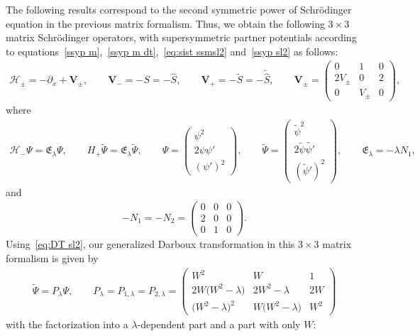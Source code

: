 \documentclass[10pt,a4paper]{amsart}
\numberwithin{equation}{section}
\begin{document}
The following results correspond to the second symmetric power of Schr\"odinger equation in the previous matrix formalism. Thus, we obtain the following $3\times 3$ matrix Schr\"odinger operators, with supersymmetric partner potentials according to equations~\eqref{ssyp m},~\eqref{ssyp m dt},~\eqref{eq:sist ssmsl2} and~\eqref{ssyp sl2} as follows:
\begin{gather*}
\mathcal H_\pm=-\partial_x+\mathbf{V}_\pm,\qquad \mathbf{V}_-=-S=-\widehat{S},\qquad \mathbf{V}_+=-\widetilde{S}=-\widetilde{\widehat{S}},\qquad \mathbf{V}_{\pm} =\begin{pmatrix}0&1&0\\2V_{\pm}&0&2\\0&V_\pm&0\end{pmatrix}\!,
\end{gather*}
where
\begin{gather*}
\mathcal H_-\Psi=\mathfrak{E}_{\lambda} \Psi,\qquad
H_+\widetilde{\Psi}=\mathfrak{E}_{\lambda} \widetilde{\Psi}, \qquad
\Psi=\begin{pmatrix} \psi^2\\2\psi\psi'\\(\psi')^2\end{pmatrix}\!,\qquad \widetilde{\Psi}=\begin{pmatrix} \widetilde{\psi}^2\\2\widetilde{\psi}\widetilde{\psi'}\\(\widetilde{\psi}')^2\end{pmatrix}\!,\qquad \mathfrak{E}_{\lambda}=-\lambda N_1,
\end{gather*}
and
\begin{gather*}
-N_1=-N_2=\begin{pmatrix}0&0&0\\2&0&0\\0&1&0\end{pmatrix}\!.
\end{gather*}
Using~\eqref{eq:DT sl2}, our generalized Darboux transformation in this $3\times 3$ matrix formalism is given by
\begin{gather*}
\widetilde{\Psi}=P_\lambda\Psi,\qquad P_\lambda=P_{1,\lambda}=P_{2,\lambda}=\begin{pmatrix}
W^2&W&1\\ 2W\big(W^2-\lambda\big)&2W^2-\lambda&2W\\ \big(W^2-\lambda\big)^2&W\big(W^2-\lambda\big)&W^2
\end{pmatrix}
\end{gather*}
with the factorization into a $\lambda$-dependent part and a part with only $W$:
\end{document}
